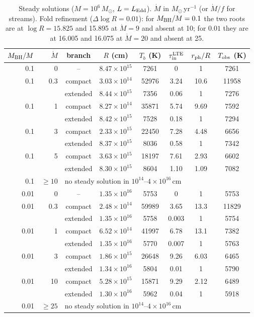 \documentclass[11pt]{article}
\newcommand{\Msun}{M_\odot}
\newcommand{\Mdot}{\dot M}
\begin{document}
\begin{table}[h]
\centering\small
\begin{tabular}{rrcccccc}
\toprule
$M_{\rm BH}/M$ & $\Mdot$ & branch & $R$ (cm) & $T_b$ (K) & $\tau_{\rm in}^{\rm LTE}$ & $r_{\rm ph}/R$ & $T_{\rm obs}$ (K)\\
\midrule
0.1 & 0   & --       & $8.47\times10^{15}$ & 7261  & 0    & 1    & 7261\\
0.1 & 0.3 & compact  & $3.03\times10^{14}$ & 52976 & 3.24 & 10.6 & 11958\\
    &     & extended & $8.44\times10^{15}$ & 7356  & 0.06 & 1    & 7276\\
0.1 & 1   & compact  & $8.27\times10^{14}$ & 35871 & 5.74 & 9.69 & 7592\\
    &     & extended & $8.42\times10^{15}$ & 7528  & 0.18 & 1    & 7294\\
0.1 & 3   & compact  & $2.33\times10^{15}$ & 22450 & 7.28 & 4.48 & 6656\\
    &     & extended & $8.37\times10^{15}$ & 8036  & 0.58 & 1    & 7342\\
0.1 & 5   & compact  & $3.63\times10^{15}$ & 18197 & 7.61 & 2.93 & 6602\\
    &     & extended & $8.30\times10^{15}$ & 8604  & 1.10 & 1.09 & 7082\\
0.1 & $\ge10$ & \multicolumn{6}{l}{no steady solution in $10^{14}$--$4\times10^{16}$\,cm}\\
\midrule
0.01 & 0   & --       & $1.35\times10^{16}$ & 5753  & 0     & 1    & 5753\\
0.01 & 0.3 & compact  & $2.48\times10^{14}$ & 59989 & 3.65  & 13.3 & 11829\\
     &     & extended & $1.35\times10^{16}$ & 5758  & 0.003 & 1    & 5754\\
0.01 & 1   & compact  & $6.52\times10^{14}$ & 41997 & 6.78  & 13.1 & 7382\\
     &     & extended & $1.35\times10^{16}$ & 5770  & 0.007 & 1    & 5763\\
0.01 & 3   & compact  & $1.86\times10^{15}$ & 26648 & 9.26  & 6.03 & 6465\\
     &     & extended & $1.34\times10^{16}$ & 5804  & 0.01  & 1    & 5790\\
0.01 & 10  & compact  & $5.28\times10^{15}$ & 15871 & 9.29  & 2.12 & 6489\\
     &     & extended & $1.30\times10^{16}$ & 5962  & 0.04  & 1    & 5918\\
0.01 & $\ge25$ & \multicolumn{6}{l}{no steady solution in $10^{14}$--$4\times10^{16}$\,cm}\\
\bottomrule
\end{tabular}
\caption{Steady solutions ($M=10^6\,\Msun$, $L=L_{\rm Edd}$). $\Mdot$ in $\Msun$\,yr$^{-1}$ (or $\Mdot/f$ for streams).
Fold refinement ($\Delta\log R=0.01$): for $M_{\rm BH}/M=0.1$ the two roots are at $\log R=15.825$ and 15.895 at
$\Mdot=9$ and absent at 10; for $0.01$ they are at 16.005 and 16.075 at $\Mdot=20$ and absent at 25.}
\label{tab:br}
\end{table}
\end{document}
